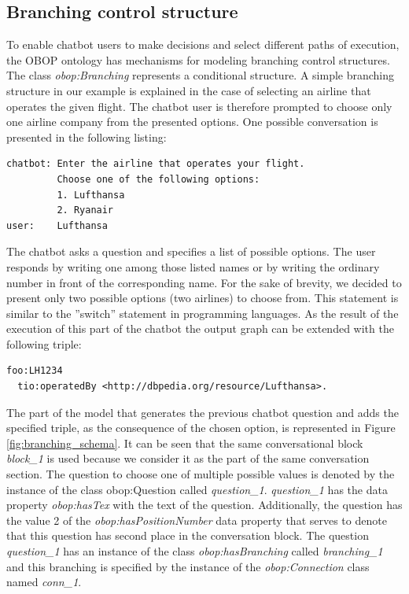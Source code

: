 \documentclass[runningheads]{llncs}
\begin{document}
\subsection{Branching control structure}
To enable chatbot users to make decisions and select different paths of execution, the OBOP ontology has mechanisms for modeling branching control structures. The class \textit{obop:Branching} represents a conditional structure. A simple branching structure in our example is explained in the case of selecting an airline that operates the given flight. The chatbot user is therefore prompted to choose only one airline company from the presented options.  
One possible conversation is presented in the following listing:
\begin{lstlisting}[basicstyle=\small,  xleftmargin=0.7cm ]
chatbot: Enter the airline that operates your flight.
         Choose one of the following options:
         1. Lufthansa
         2. Ryanair
user:    Lufthansa 
\end{lstlisting}
The chatbot asks a question and specifies a list of possible options. The user responds by writing one among those listed names or by writing the ordinary number in front of the corresponding name. For the sake of brevity, we decided to present only two possible options (two airlines) to choose from. This statement is similar to the ''switch'' statement in programming languages. As the result of the execution of this part of the chatbot the output graph can be extended with the following triple:
\begin{lstlisting}[basicstyle=\small,  xleftmargin=0.7cm ]
foo:LH1234
  tio:operatedBy <http://dbpedia.org/resource/Lufthansa>.
\end{lstlisting}
The part of the model that generates the previous chatbot question and adds the specified triple, as the consequence of the chosen option, is represented in Figure \ref{fig:branching_schema}. It can be seen that the same conversational block \textit{block\_1} is used because we consider it as the part of the same conversation section. The question to choose one of multiple possible values is denoted by the instance of the class obop:Question called \textit{question\_1}. \textit{question\_1} has the data property \textit{obop:hasTex} with the text of the question. Additionally, the question has the value 2 of the \textit{obop:hasPositionNumber} data property that serves to denote that this question has second place in the conversation block.         
The question \textit{question\_1} has an instance of the class \textit{obop:hasBranching} called \textit{branching\_1} and this branching is specified by the instance of the \textit{obop:Connection} class named \textit{conn\_1}.
\end{document}
